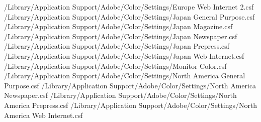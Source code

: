 /Library/Application Support/Adobe/Color/Settings/Europe Web Internet 2.csf
/Library/Application Support/Adobe/Color/Settings/Japan General Purpose.csf
/Library/Application Support/Adobe/Color/Settings/Japan Magazine.csf
/Library/Application Support/Adobe/Color/Settings/Japan Newspaper.csf
/Library/Application Support/Adobe/Color/Settings/Japan Prepress.csf
/Library/Application Support/Adobe/Color/Settings/Japan Web Internet.csf
/Library/Application Support/Adobe/Color/Settings/Monitor Color.csf
/Library/Application Support/Adobe/Color/Settings/North America General Purpose.csf
/Library/Application Support/Adobe/Color/Settings/North America Newspaper.csf
/Library/Application Support/Adobe/Color/Settings/North America Prepress.csf
/Library/Application Support/Adobe/Color/Settings/North America Web Internet.csf



